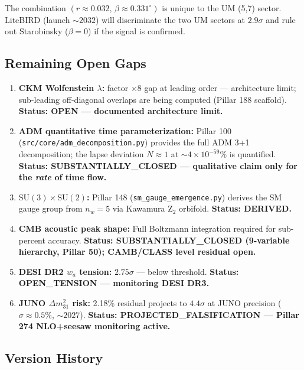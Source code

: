 \documentclass[12pt,a4paper]{article}
\begin{document}
The combination $(r \approx 0.032,\, \beta \approx 0.331^\circ)$ is unique to the UM (5,7)
sector. LiteBIRD (launch $\sim 2032$) will discriminate the two UM sectors at $2.9\sigma$
and rule out Starobinsky ($\beta = 0$) if the signal is confirmed.

\subsection*{Remaining Open Gaps}

\begin{enumerate}
  \item \textbf{CKM Wolfenstein $\lambda$:} factor $\times 8$ gap at
        leading order — architecture limit; sub-leading off-diagonal
        overlaps are being computed (Pillar 188 scaffold).
        \textbf{Status: OPEN — documented architecture limit.}
  \item \textbf{ADM quantitative time parameterization:}
        Pillar 100 (\texttt{src/core/adm\_decomposition.py}) provides the
        full ADM 3+1 decomposition; the lapse deviation $N \approx 1$ at
        $\sim 4 \times 10^{-59}\%$ is quantified.
        \textbf{Status: SUBSTANTIALLY\_CLOSED — qualitative claim only for
        the \emph{rate} of time flow.}
  \item \textbf{$\mathrm{SU}(3) \times \mathrm{SU}(2)$:} Pillar 148
        (\texttt{sm\_gauge\_emergence.py}) derives the SM gauge group
        from $n_w = 5$ via Kawamura Z$_2$ orbifold.
        \textbf{Status: DERIVED.}
  \item \textbf{CMB acoustic peak shape:} Full Boltzmann integration
        required for sub-percent accuracy.
        \textbf{Status: SUBSTANTIALLY\_CLOSED (9-variable hierarchy, Pillar 50);
        CAMB/CLASS level residual open.}
  \item \textbf{DESI DR2 $w_a$ tension:} $2.75\sigma$ — below threshold.
        \textbf{Status: OPEN\_TENSION — monitoring DESI DR3.}
  \item \textbf{JUNO $\Delta m^2_{31}$ risk:} 2.18\% residual projects to $4.4\sigma$
        at JUNO precision ($\sigma \approx 0.5\%$, $\sim 2027$).
        \textbf{Status: PROJECTED\_FALSIFICATION — Pillar 274 NLO+seesaw monitoring active.}
\end{enumerate}

\subsection*{Version History}
\end{document}
